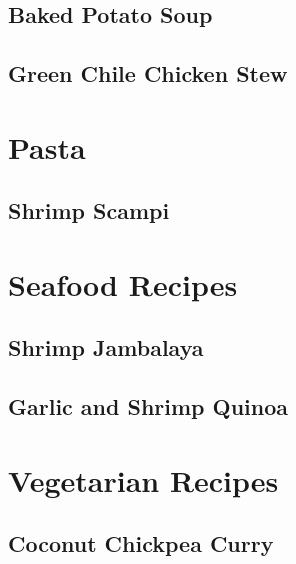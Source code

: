 \documentclass{report}
\begin{document}
\section{Baked Potato Soup}

\newpage 


\section{Green Chile Chicken Stew}


\chapter{Pasta}
\newpage

\section{Shrimp Scampi}


\chapter{Seafood Recipes}
\newpage

\section{Shrimp Jambalaya}

\newpage


\section{Garlic and Shrimp Quinoa}


\chapter{Vegetarian Recipes}
\newpage 
\section{Coconut Chickpea Curry}

\newpage 
%
\end{document}
